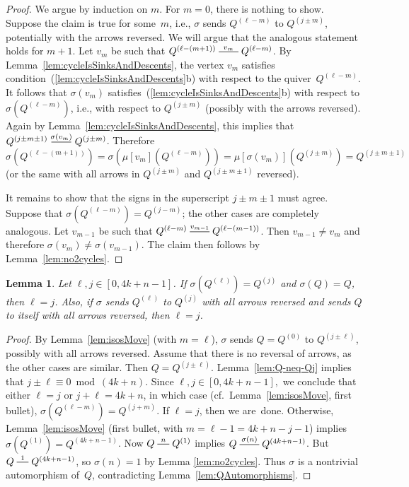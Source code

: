 \documentclass[11pt, letterpaper]{amsart}
\newtheorem{lemma}[theorem]{Lemma}
\theoremstyle{definition}
\numberwithin{equation}{section}
\newcommand{\T}[2]{\mu[#1](#2)} %
\newcommand{\mutation}[1]{\stackrel{#1}{\rule[.5ex]{2em}{0.5pt}}}
\newcommand{\shortmutation}[1]{\stackrel{#1}{\rule[.5ex]{1.2em}{0.5pt}}}
\begin{document}
\begin{proof}
We argue by induction on $m$.
For $m=0$, there is nothing to show.
Suppose the claim is true for some~$m$, i.e., $\sigma$ sends $Q^{(\ell-m)}$ to $Q^{(j\pm m)}$, 
potentially with the arrows reversed. 
We will argue that the analogous statement holds for $m+1$. 
Let $v_m$ be such that $Q^{(\ell-(m+1))} \mutation{v_m} Q^{(\ell-m)}$.
By Lemma~\ref{lem:cycleIsSinksAndDescents}, 
the vertex $v_m$ satisfies condition~(\ref{lem:cycleIsSinksAndDescents}b) with respect to the quiver~$Q^{(\ell-m)}$. 
It follows that $\sigma(v_m)$ satisfies~(\ref{lem:cycleIsSinksAndDescents}b) with respect to $\sigma(Q^{(\ell-m)})$,
i.e., with respect to $Q^{(j\pm m)}$ (possibly with the arrows reversed). 
Again by Lemma~\ref{lem:cycleIsSinksAndDescents}, this implies that 
$Q^{(j \pm m \pm 1)} \mutation{\sigma(v_m)} Q^{(j \pm m)}$.
Therefore
\[
\sigma(Q^{(\ell-(m+1))}) = \sigma(\T{v_m}{Q^{(\ell-m)}}) = \T{\sigma(v_m)}{Q^{(j\pm m)}} = Q^{(j \pm m \pm 1)}
\]
(or the same with all arrows in $Q^{(j \pm m)}$ and $Q^{(j \pm m\pm 1)}$ reversed). 

It remains to show that the signs in the superscript $j \pm m \pm 1$ must agree. 
Suppose that $\sigma(Q^{(\ell-m)}) = Q^{(j-m)}$; the other cases are completely analogous.
Let $v_{m-1}$ be such that $Q^{(\ell-m)} \mutation{v_{m-1}} Q^{(\ell-(m-1))}$. 
Then $v_{m-1} \neq v_m$ and therefore $\sigma(v_m) \neq \sigma(v_{m-1})$. 
The claim then follows by Lemma~\ref{lem:no2cycles}. 
\end{proof}

\begin{lemma}
\label{lem:noIsoFixesQ}
Let $\ell, j \in[0,4k+n-1]$. 
If $\sigma(Q^{(\ell)})=Q^{(j)}$ and $\sigma(Q)=Q$, then $\ell = j$.
Also, if $\sigma$ sends $Q^{(\ell)}$ to $Q^{(j)}$ with all arrows reversed 
and sends $Q$ to itself with all arrows reversed, then $\ell = j$.
\end{lemma}

\begin{proof}
By Lemma~\ref{lem:isosMove} (with $m=\ell$), $\sigma$ sends $Q = Q^{(0)}$ to $Q^{(j \pm \ell)}$,
possibly with all arrows reversed. 
Assume that there is no reversal of arrows, as the other cases are similar. 
Then $Q=Q^{(j \pm \ell)}$.
Lemma~\ref{lem:Q-neq-Qj} implies that $j \pm \ell \equiv 0 \bmod\!(4k+n)$.
Since $\ell, j \in [0, 4k+n-1],$ we conclude that either $\ell=j$ or $j + \ell = 4k+n$,
in which case (cf.\ Lemma~\ref{lem:isosMove}, first bullet), $\sigma(Q^{(\ell-m)})=Q^{(j+m)}$.
%
If $\ell=j$, then we are~done. Otherwise, Lemma~\ref{lem:isosMove} (first bullet, with $m = \ell-1 = 4k+n-j-1$) 
implies ${\sigma(Q^{(1)})=Q^{(4k+n-1)}}$. 
Now $Q \shortmutation{n} Q^{(1)}$ implies $Q \mutation{\sigma(n)} {Q^{(4k+n-1)}}$.
But $Q \shortmutation{1} Q^{(4k+n-1)} $, so $\sigma(n)=1$ by Lemma \ref{lem:no2cycles}.
Thus $\sigma$ is a nontrivial automorphism of~$Q$, contradicting Lemma~\ref{lem:QAutomorphisms}.
\end{proof}
\end{document}

